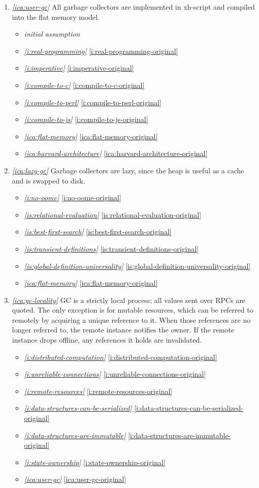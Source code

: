 \documentclass{report}
\makeatletter
\newcommand*{\Label}[2]{%
  \@bsphack
  \begingroup
    \label{#1-original}%
    \def\@currentlabel{#2}%
    \label{#1}%
  \endgroup
  \@esphack
}
\newcommand{\initial}{{\em initial assumption}}
\newcommand{\refboth}[1]{{\em \ref{#1}} \ref{#1-original}}
\makeatother
\begin{document}
\begin{enumerate}
\item{}\Label{ica:user-gc}{ca.usergc}{\em\ref{ica:user-gc}}
  All garbage collectors are implemented in xh-script and compiled into the
  flat memory model.
\begin{itemize}
\item \initial
\item \refboth{i:real-programming}
\item \refboth{i:imperative}
\item \refboth{i:compile-to-c}
\item \refboth{i:compile-to-perl}
\item \refboth{i:compile-to-js}
\item \refboth{ica:flat-memory}
\item \refboth{ica:harvard-architecture}
\end{itemize}
\item{}\Label{ica:lazy-gc}{ca.lazygc}{\em\ref{ica:lazy-gc}}
  Garbage collectors are lazy, since the heap is useful as a cache and is
  swapped to disk.
\begin{itemize}
\item \refboth{i:no-oome}
\item \refboth{is:relational-evaluation}
\item \refboth{is:best-first-search}
\item \refboth{is:transient-definitions}
\item \refboth{is:global-definition-universality}
\item \refboth{ica:flat-memory}
\end{itemize}
\item{}\Label{ica:gc-locality}{ca.gclocality}{\em\ref{ica:gc-locality}}
  GC is a strictly local process; all values sent over RPCs are quoted. The
  only exception is for mutable resources, which can be referred to
  remotely by acquiring a unique reference to it. When those references are
  no longer referred to, the remote instance notifies the owner. If the
  remote instance drops offline, any references it holds are invalidated.
\begin{itemize}
\item \refboth{i:distributed-computation}
\item \refboth{i:unreliable-connections}
\item \refboth{i:remote-resources}
\item \refboth{i:data-structures-can-be-serialized}
\item \refboth{i:data-structures-are-immutable}
\item \refboth{i:state-ownership}
\item \refboth{ica:user-gc}
\end{itemize}


\end{enumerate}
\end{document}
